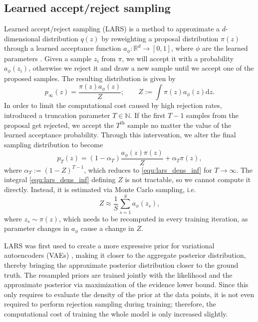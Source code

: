 \documentclass[twoside]{article}
\newcommand{\D}{\mathrm{d}}
\begin{document}
\subsection{Learned accept/reject sampling}
\label{sec:back_rejection_sampling}

Learned accept/reject sampling (LARS) is a method to approximate a $d$-dimensional distribution $q(z)$ by reweighting a proposal distribution $\pi(z)$ through a learned acceptance function $a_\phi: \mathds{R}^d \rightarrow [0,1]$, where $\phi$ are the learned parameters \citep{Bauer2019}. Given a sample $z_i$ from $\pi$, we will accept it with a probability $a_\phi(z_i)$, otherwise we reject it and draw a new sample until we accept one of the proposed samples. The resulting distribution is given by
\begin{equation}
	p_\infty(z) = \frac{\pi(z)a_\phi(z)}{Z};\quad\quad Z := \int\pi(z)a_\phi(z) \D z.
	\label{equ:lars_dens_inf}
\end{equation}
In order to limit the computational cost caused by high rejection rates, \cite{Bauer2019} introduced a truncation parameter $T\in\mathds{N}$. If the first $T-1$ samples from the proposal get rejected, we accept the $T^\text{th}$ sample no matter the value of the learned acceptance probability. Through this intervention, we alter the final sampling distribution to become
\begin{equation}
	p_T(z) = (1 - \alpha_T) \frac{a_\phi(z) \pi(z)}{Z} + \alpha_T \pi(z),
	\label{sec:lars_dens_trunc}
\end{equation}
where $\alpha_T := (1-Z)^{T-1}$, which reduces to \eqref{equ:lars_dens_inf} for $T\rightarrow\infty$. The integral \eqref{equ:lars_dens_inf} defining $Z$ is not tractable, so we cannot compute it directly. Instead, it is estimated via Monte Carlo sampling, i.e.
\begin{equation}
	Z \approx \frac{1}{S} \sum_{s = 1}^{S} a_\phi(z_s),
	\label{equ:lars_z_mc}
\end{equation}
where $z_s \sim \pi(z)$, which needs to be recomputed in every training iteration, as parameter changes in $a_\phi$ cause a change in $Z$.

LARS was first used to create a more expressive prior for variational autoencoders (VAEs) \citep{Kingma2014}, making it closer to the aggregate posterior distribution, thereby bringing the approximate posterior distribution closer to the ground truth. The resampled priors are trained jointly with the likelihood and the approximate posterior via maximization of the evidence lower bound. Since this only requires to evaluate the density of the prior at the data points, it is not even required to perform rejection sampling during training; therefore, the computational cost of training the whole model is only increased slightly.
\end{document}
